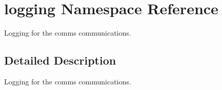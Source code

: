 \hypertarget{namespacelogging}{}\section{logging Namespace Reference}
\label{namespacelogging}


Logging for the comms communications.  




\subsection{Detailed Description}
Logging for the comms communications. 

